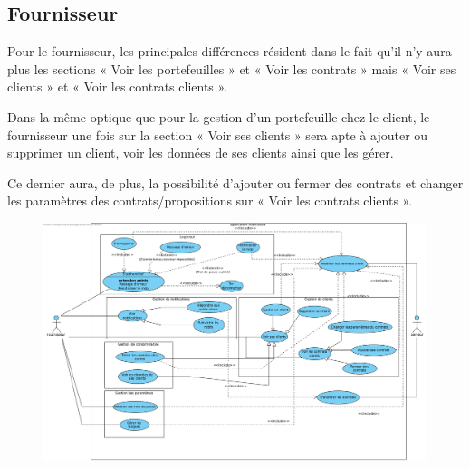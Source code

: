 \newpage

\subsection{Fournisseur}

\begin{flushleft}
Pour le fournisseur, les principales différences résident dans le fait qu’il n’y aura plus les sections « Voir les portefeuilles » et « Voir les contrats » mais « Voir ses clients » et « Voir les contrats clients ».
\end{flushleft}

\begin{flushleft}
Dans la même optique que pour la gestion d’un portefeuille chez le client, le fournisseur une fois sur la section « Voir ses clients » sera apte à ajouter ou supprimer un client, voir les données de ses clients ainsi que les gérer.
\end{flushleft}

\begin{flushleft}
Ce dernier aura, de plus, la possibilité d’ajouter ou fermer des contrats et changer les paramètres des contrats/propositions sur « Voir les contrats clients ».
\end{flushleft}

\begin{figure}[h]
\centering
\includegraphics[width = 1\textwidth]{Base/use_case/img/fournisseur.png}
\end{figure}
